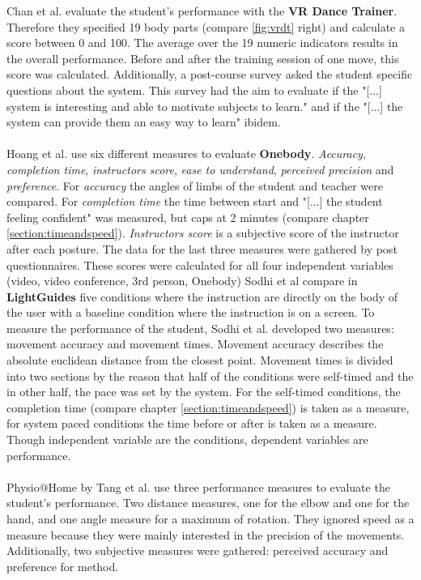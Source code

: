 Chan et al. evaluate the student's performance with the \textbf{VR Dance Trainer}. Therefore they specified 19 body parts (compare \ref{fig:vrdt} right) and calculate a score between 0 and 100. The average over the 19 numeric indicators results in the overall performance. Before and after the training session of one move, this score was calculated. Additionally, a post-course survey asked the student specific questions about the system. This survey had the aim to evaluate if the "[...] system is interesting and able to motivate subjects to learn." \cite{Chan2010} and if the "[...] the system can provide them an easy way to learn" ibidem.\\ \\
Hoang et al. \cite{Hoang2016} use six different measures to evaluate \textbf{Onebody}. \textit{Accuracy}, \textit{completion time}, \textit{instructors score}, \textit{ease to understand}, \textit{perceived precision} and \textit{preference}. For \textit{accuracy} the angles of limbs of the student and teacher were compared. For \textit{completion time} the time between start and "[...] the student feeling confident" was measured, but caps at 2 minutes (compare chapter \ref{section:timeandspeed}). \textit{Instructors score} is a subjective score of the instructor after each posture. The data for the last three measures were gathered by post questionnaires. These scores were calculated for all four independent variables (video, video conference, 3rd person, Onebody)
Sodhi et al \cite{Sodhi2012} compare in \textbf{LightGuides} five conditions where the instruction are directly on the body of the user with a baseline condition where the instruction is on a screen. To measure the performance of the student, Sodhi et al. developed two measures: movement accuracy and movement times. Movement accuracy describes the absolute euclidean distance from the closest point. Movement times is divided into two sections by the reason that half of the conditions were self-timed and the in other half, the pace was set by the system. For the self-timed conditions, the completion time (compare chapter \ref{section:timeandspeed}) is taken as a measure, for system paced conditions the time before or after is taken as a measure. Though independent variable are the conditions, dependent variables are performance.\\ \\
Physio@Home by Tang et al. \cite{Tang2015} use three performance measures to evaluate the student's performance. Two distance measures, one for the elbow and one for the hand, and one angle measure for a maximum of rotation. They ignored speed as a measure because they were mainly interested in the precision of the movements. Additionally, two subjective measures were gathered: perceived accuracy and preference for method.

